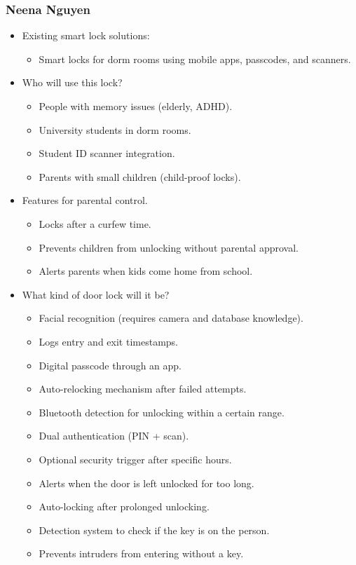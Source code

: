 \subsubsection*{Neena Nguyen}
\begin{itemize}
    \item Existing smart lock solutions:
    \begin{itemize}
        \item Smart locks for dorm rooms using mobile apps, passcodes, and scanners.
    \end{itemize}
    \item Who will use this lock?
    \begin{itemize}
        \item People with memory issues (elderly, ADHD).
        \item University students in dorm rooms.
        \item Student ID scanner integration.
        \item Parents with small children (child-proof locks).
    \end{itemize}
    \item Features for parental control.
    \begin{itemize}
        \item Locks after a curfew time.
        \item Prevents children from unlocking without parental approval.
        \item Alerts parents when kids come home from school.
    \end{itemize}
    \item What kind of door lock will it be?
    \begin{itemize}
        \item Facial recognition (requires camera and database knowledge).
        \item Logs entry and exit timestamps.
        \item Digital passcode through an app.
        \item Auto-relocking mechanism after failed attempts.
        \item Bluetooth detection for unlocking within a certain range.
        \item Dual authentication (PIN + scan).
        \item Optional security trigger after specific hours.
        \item Alerts when the door is left unlocked for too long.
        \item Auto-locking after prolonged unlocking.
        \item Detection system to check if the key is on the person.
        \item Prevents intruders from entering without a key.
    \end{itemize}
\end{itemize}

